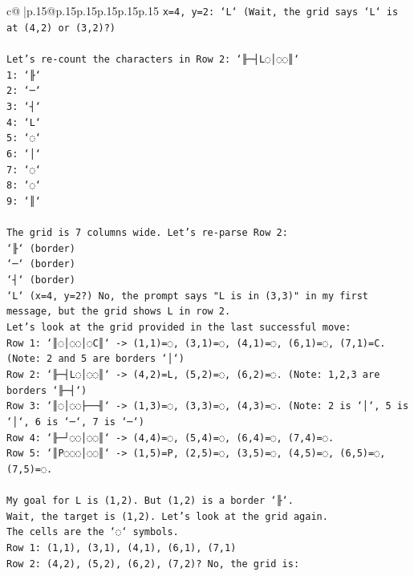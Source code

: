 \documentclass{article}
\begin{document}
{\begin{supertabular}{c@{$\;$}|p{.15\linewidth}@{}p{.15\linewidth}p{.15\linewidth}p{.15\linewidth}p{.15\linewidth}p{.15\linewidth}}
{{{\texttt{x=4, y=2: `L` (Wait, the grid says `L` is at (4,2) or (3,2)?)} \\
\\ 
\texttt{Let's re{-}count the characters in Row 2: `╟─┤L◌│◌◌║`} \\
\texttt{1: `╟`} \\
\texttt{2: `─`} \\
\texttt{3: `┤`} \\
\texttt{4: `L`} \\
\texttt{5: `◌`} \\
\texttt{6: `│`} \\
\texttt{7: `◌`} \\
\texttt{8: `◌`} \\
\texttt{9: `║`} \\
\\ 
\texttt{The grid is 7 columns wide. Let's re{-}parse Row 2:} \\
\texttt{`╟` (border)} \\
\texttt{`─` (border)} \\
\texttt{`┤` (border)} \\
\texttt{`L` (x=4, y=2?) No, the prompt says "L is in (3,3)" in my first message, but the grid shows L in row 2.} \\
\texttt{Let's look at the grid provided in the last successful move:} \\
\texttt{Row 1: `║◌│◌◌│◌C║` {-}> (1,1)=◌, (3,1)=◌, (4,1)=◌, (6,1)=◌, (7,1)=C. (Note: 2 and 5 are borders `│`)} \\
\texttt{Row 2: `╟─┤L◌│◌◌║` {-}> (4,2)=L, (5,2)=◌, (6,2)=◌. (Note: 1,2,3 are borders `╟─┤`)} \\
\texttt{Row 3: `║◌│◌◌├──╢` {-}> (1,3)=◌, (3,3)=◌, (4,3)=◌. (Note: 2 is `│`, 5 is `│`, 6 is `─`, 7 is `─`)} \\
\texttt{Row 4: `╟─┘◌◌│◌◌║` {-}> (4,4)=◌, (5,4)=◌, (6,4)=◌, (7,4)=◌.} \\
\texttt{Row 5: `║P◌◌◌│◌◌║` {-}> (1,5)=P, (2,5)=◌, (3,5)=◌, (4,5)=◌, (6,5)=◌, (7,5)=◌.} \\
\\ 
\texttt{My goal for L is (1,2). But (1,2) is a border `╟`.} \\
\texttt{Wait, the target is (1,2). Let's look at the grid again.} \\
\texttt{The cells are the `◌` symbols.} \\
\texttt{Row 1: (1,1), (3,1), (4,1), (6,1), (7,1)} \\
\texttt{Row 2: (4,2), (5,2), (6,2), (7,2)? No, the grid is:} \\
}}}
\end{supertabular}}
\end{document}

